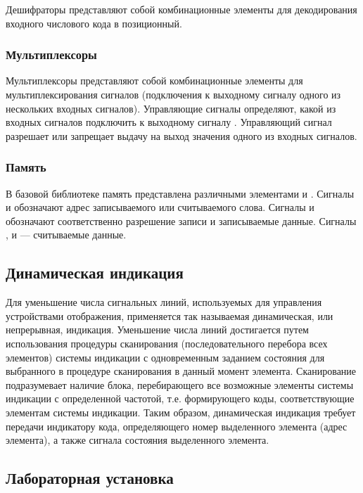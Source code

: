 Дешифраторы представляют собой комбинационные элементы для декодирования входного числового кода в позиционный.

\subsubsection{Мультиплексоры}

Мультиплексоры представляют собой комбинационные элементы для мультиплексирования сигналов (подключения к выходному сигналу одного из нескольких входных сигналов). Управляющие сигналы  определяют, какой из входных сигналов  подключить к выходному сигналу . Управляющий сигнал  разрешает или запрещает выдачу на выход значения одного из входных сигналов.

\subsubsection{Память}

В базовой библиотеке память представлена различными элементами  и . Сигналы  и  обозначают адрес записываемого или считываемого слова. Сигналы  и  обозначают соответственно разрешение записи и записываемые данные. Сигналы ,  и  --- считываемые данные.

\subsection{Динамическая индикация}

Для уменьшение числа сигнальных линий, используемых для управления устройствами отображения, применяется так называемая динамическая, или непрерывная, индикация. Уменьшение числа линий достигается путем использования процедуры сканирования (последовательного перебора всех элементов) системы индикации с одновременным заданием состояния для выбранного в процедуре сканирования в данный момент элемента. Сканирование подразумевает наличие блока, перебирающего все возможные элементы системы индикации с определенной частотой, т.е. формирующего коды, соответствующие элементам системы индикации. Таким образом, динамическая индикация требует передачи индикатору кода, определяющего номер выделенного элемента (адрес элемента), а также сигнала состояния выделенного элемента.

\subsection{Лабораторная установка}


